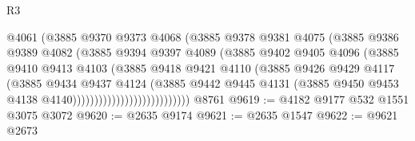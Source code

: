 \begin{lexlean}{R3}
\begin{coremodule}
                                    @4061
                                    (@3885
                                      @9370
                                      @9373
                                      @4068
                                      (@3885
                                        @9378
                                        @9381
                                        @4075
                                        (@3885
                                          @9386
                                          @9389
                                          @4082
                                          (@3885
                                            @9394
                                            @9397
                                            @4089
                                            (@3885
                                              @9402
                                              @9405
                                              @4096
                                              (@3885
                                                @9410
                                                @9413
                                                @4103
                                                (@3885
                                                  @9418
                                                  @9421
                                                  @4110
                                                  (@3885
                                                    @9426
                                                    @9429
                                                    @4117
                                                    (@3885
                                                      @9434
                                                      @9437
                                                      @4124
                                                      (@3885
                                                        @9442
                                                        @9445
                                                        @4131
                                                        (@3885
                                                          @9450
                                                          @9453
                                                          @4138
                                                          @4140)))))))))))))))))))))))))))
    @8761
@9619 := @4182 @9177 @532 @1551 @3075 @3072
@9620 := @2635 @9174
@9621 := @2635 @1547
@9622 := @9621 @2673

\end{coremodule}
\end{lexlean}
